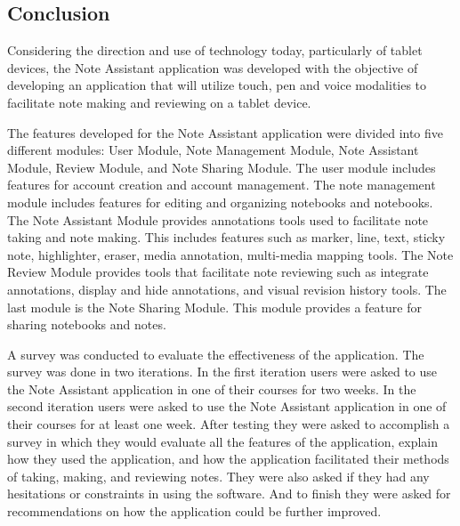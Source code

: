 %
%
%                 


\label{sec:conclusionandrecommendations}

\subsection{Conclusion}
\label{sec:conclusion}

Considering the direction and use of technology today, particularly of tablet devices, the Note Assistant application was developed with the objective of developing an application that will utilize touch, pen and voice modalities to facilitate note making and reviewing on a tablet device.

The features developed for the Note Assistant application were divided into five different modules: User Module, Note Management Module, Note Assistant Module, Review Module, and Note Sharing Module. The user module includes features for account creation and account management. The note management module includes features for editing and organizing notebooks and notebooks.  The Note Assistant Module provides annotations tools used to facilitate note taking and note making. This includes features such as marker, line, text, sticky note, highlighter, eraser, media annotation, multi-media mapping tools. The Note Review Module provides tools that facilitate note reviewing such as integrate annotations, display and hide annotations, and visual revision history tools. The last module is the Note Sharing Module. This module provides a feature for sharing notebooks and notes.

A survey was conducted to evaluate the effectiveness of the application. The survey was done in two iterations. In the first iteration users were asked to use the Note Assistant application in one of their courses for two weeks. In the second iteration users were asked to use the Note Assistant application in one of their courses for at least one week. After testing they were asked to accomplish a survey in which they would evaluate all the features of the application, explain how they used the application, and how the application facilitated their methods of taking, making, and reviewing notes. They were also asked if they had any hesitations or constraints in using the software. And to finish they were asked for recommendations on how the application could be further improved.

